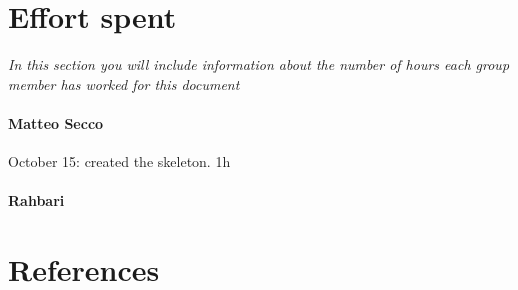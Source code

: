 \documentclass{article}
\begin{document}
\section{Effort spent} \textit{In this section you will include information about the number of hours each group member has worked for this document}
	\paragraph{Matteo Secco} 
		\begin{list}{-}{}
			\item October 15: created the skeleton. 1h
		\end{list}
	\paragraph{Rahbari}
\section{References}
\end{document}
